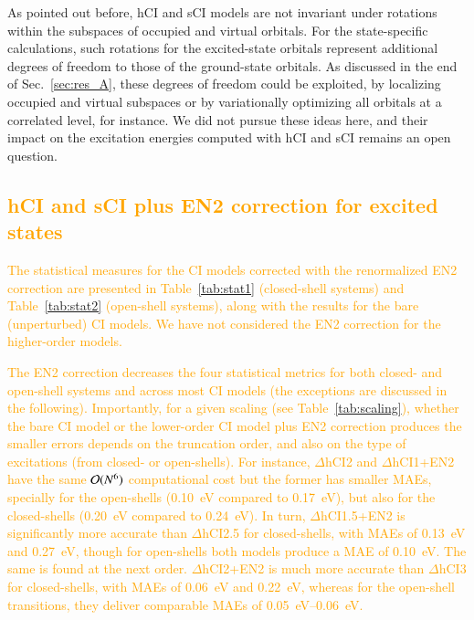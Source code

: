 \documentclass[aip,jcp,reprint,noshowkeys,superscriptaddress]{revtex4-1}
\newcommand{\fk}[1]{\textcolor{orange}{#1}}
\begin{document}
As pointed out before, hCI and sCI models are not invariant under rotations within the subspaces of occupied and virtual orbitals.
For the state-specific calculations, such rotations for the excited-state orbitals represent additional degrees of freedom to those of the ground-state orbitals. \cite{Kossoski_2022}
As discussed in the end of Sec.~\ref{sec:res_A}, these degrees of freedom could be exploited,
by localizing occupied and virtual subspaces or by variationally optimizing all orbitals at a correlated level, for instance.
We did not pursue these ideas here, and their impact on the excitation energies computed with hCI and sCI remains an open question.

\subsection{\fk{hCI and sCI plus EN2 correction for excited states}}
\label{sec:res_E}

\fk{
The statistical measures for the CI models corrected with the renormalized EN2 correction are presented in 
Table~\ref{tab:stat1} (closed-shell systems) and Table~\ref{tab:stat2} (open-shell systems),
along with the results for the bare (unperturbed) CI models.
We have not considered the EN2 correction for the higher-order models.
}

\fk{
The EN2 correction decreases the four statistical metrics for both closed- and open-shell systems and across most CI models (the exceptions are discussed in the following).
Importantly, for a given scaling (see Table~\ref{tab:scaling}), whether the bare CI model or the lower-order CI model plus EN2 correction produces the smaller errors depends on the truncation order,
and also on the type of excitations (from closed- or open-shells).
For instance, $\Delta$hCI2 and $\Delta$hCI1+EN2 have the same $\order*{N^6}$ computational cost
but the former has smaller MAEs, specially for the open-shells (\SI{0.10}{\eV} compared to \SI{0.17}{\eV}), but also for the closed-shells (\SI{0.20}{\eV} compared to \SI{0.24}{\eV}).
In turn, $\Delta$hCI1.5+EN2 is significantly more accurate than $\Delta$hCI2.5 for closed-shells, 
with MAEs of \SI{0.13}{\eV} and \SI{0.27}{\eV}, though for open-shells both models produce a MAE of \SI{0.10}{\eV}.
The same is found at the next order.
$\Delta$hCI2+EN2 is much more accurate than $\Delta$hCI3 for closed-shells, with MAEs of \SI{0.06}{\eV} and \SI{0.22}{\eV},
whereas for the open-shell transitions, they deliver comparable MAEs of \SIrange{0.05}{0.06}{\eV}.
}
\end{document}
